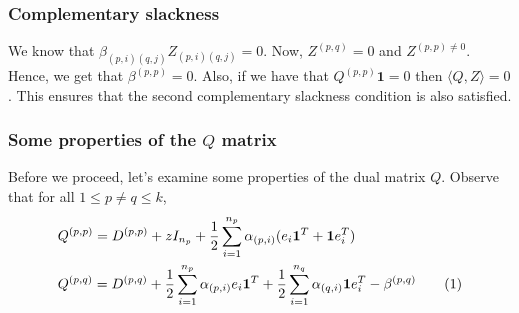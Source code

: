 \documentclass[12pt]{article}
\newcommand{\mb}{\mathbf}
\newcommand\numberthis{\addtocounter{equation}{1}\tag{\theequation}}
\begin{document}
\subsubsection*{Complementary slackness}
We know that $\beta_{(p, i)(q, j)} Z_{(p, i)(q, j)} = 0$. Now, $Z^{(p, q)} = 0$ and $Z^{(p, p) \neq 0}$. Hence, we get that $\beta^{(p, p)} = 0$. Also, if we have that $Q^{(p,p)}\mb1 = 0$ then $\langle Q, Z \rangle = 0$. This ensures that the second complementary slackness condition is also satisfied. 

\subsubsection*{Some properties of the $Q$ matrix}
Before we proceed, let's examine some properties of the dual matrix $Q$. Observe that for all $1 \le p\neq q \le k$, 
\begin{alignat*}{1}
&Q^{(p,p)} = D^{(p,p)} + zI_{n_p} + \frac{1}{2}\sum_{i=1}^{n_p} \alpha_{(p,i)} (e_{i}\mb 1^T + \mb 1e_{i}^T)\\
&Q^{(p,q)} = D^{(p,q)} + \frac{1}{2}\sum_{i=1}^{n_p} \alpha_{(p,i)} e_{i}\mb 1^T + \frac{1}{2}\sum_{i=1}^{n_q}\alpha_{(q,i)}\mb 1e_{i}^T - \beta^{(p,q)}
\label{a-eqn:q}\numberthis
\end{alignat*} 
\end{document}
